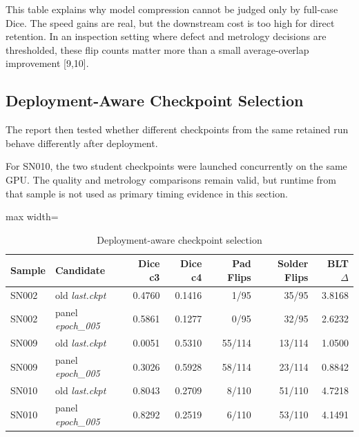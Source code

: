 This table explains why model compression cannot be judged only by
full-case Dice. The speed gains are real, but the downstream cost is too
high for direct retention. In an inspection setting where defect and
metrology decisions are thresholded, these flip counts matter more than
a small average-overlap improvement {[}9,10{]}.

\hypertarget{deployment-aware-checkpoint-selection}{%
\subsection{Deployment-Aware Checkpoint
Selection}\label{deployment-aware-checkpoint-selection}}

The report then tested whether different checkpoints from the same
retained run behave differently after deployment.

For SN010, the two student checkpoints were launched
concurrently on the same GPU. The quality and metrology comparisons
remain valid, but runtime from that sample is not used as primary timing
evidence in this section.

\begin{table}[H]
\centering
\caption{Deployment-aware checkpoint selection}
\label{tab:checkpoint-select}
\begin{adjustbox}{max width=\textwidth}
\renewcommand{\arraystretch}{1.15}
\begin{tabular}{ll rr rr r}
\toprule
\textbf{Sample} & \textbf{Candidate} & \textbf{Dice c3} & \textbf{Dice c4} & \textbf{Pad Flips} & \textbf{Solder Flips} & \textbf{BLT $\Delta$} \\
\midrule
SN002 & old \emph{last.ckpt}     & 0.4760 & 0.1416 & 1/95   & 35/95  & 3.8168 \\
SN002 & panel \emph{epoch\_005}  & 0.5861 & 0.1277 & 0/95   & 32/95  & 2.6232 \\
\midrule
SN009 & old \emph{last.ckpt}     & 0.0051 & 0.5310 & 55/114 & 13/114 & 1.0500 \\
SN009 & panel \emph{epoch\_005}  & 0.3026 & 0.5928 & 58/114 & 23/114 & 0.8842 \\
\midrule
SN010 & old \emph{last.ckpt}     & 0.8043 & 0.2709 & 8/110  & 51/110 & 4.7218 \\
SN010 & panel \emph{epoch\_005}  & 0.8292 & 0.2519 & 6/110  & 53/110 & 4.1491 \\
\bottomrule
\end{tabular}
\end{adjustbox}
\end{table}

